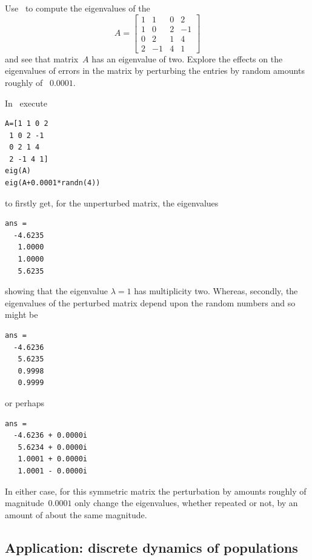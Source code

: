 \begin{example} 
Use \script\ to compute the eigenvalues of the 
\begin{equation*}
A=\begin{bmatrix}1&1&0&2
\\1&0&2&-1
\\0&2&1&4
\\2&-1&4&1\end{bmatrix}
\end{equation*}
and see that matrix~\(A\) has an eigenvalue of  two.  
Explore the effects on the eigenvalues of errors in the matrix by perturbing the entries by random amounts roughly of ~\(0.0001\).
\begin{solution} 
In \script\ execute
\begin{verbatim}
A=[1 1 0 2
 1 0 2 -1
 0 2 1 4
 2 -1 4 1]
eig(A)
eig(A+0.0001*randn(4))
\end{verbatim}
\setbox\ajrqrbox\hbox{}%
\marginajrbox%
to firstly get, for the unperturbed matrix, the eigenvalues
\begin{verbatim}
ans =
  -4.6235
   1.0000
   1.0000
   5.6235
\end{verbatim}
showing that the eigenvalue \(\lambda=1\) has multiplicity two.
Whereas, secondly, the eigenvalues of the perturbed matrix depend upon the random numbers and so might be
\begin{verbatim}
ans =
  -4.6236
   5.6235
   0.9998
   0.9999
\end{verbatim}
or perhaps
\begin{verbatim}
ans =
  -4.6236 + 0.0000i
   5.6234 + 0.0000i
   1.0001 + 0.0000i
   1.0001 - 0.0000i
\end{verbatim}
In either case, for this symmetric matrix the perturbation by amounts roughly of magnitude~\(0.0001\) only change the eigenvalues, whether repeated or not, by an amount of about the same magnitude.
\end{solution}
\end{example}











\subsection{Application: discrete dynamics of populations}
\label{sec:ddp}

